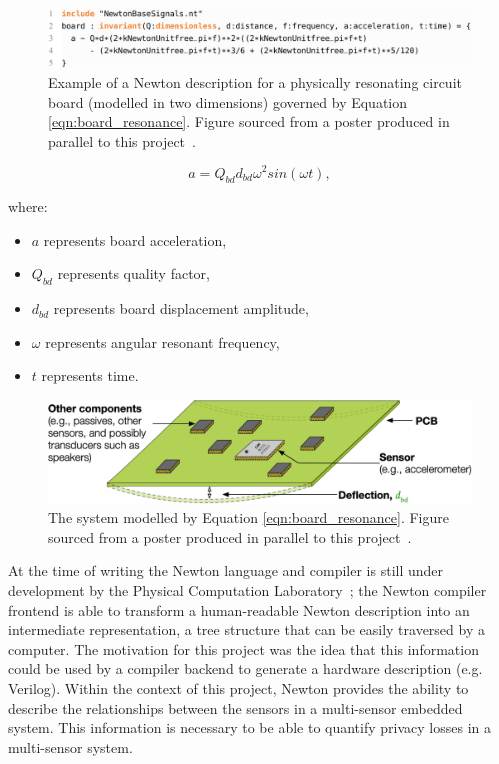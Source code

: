\documentclass[12pt]{article}
\begin{document}
    \begin{figure}[H]
      \centering
      \includegraphics[width=\textwidth]{fig/newton_description.png}
      \caption{Example of a Newton description for a physically resonating circuit board (modelled in two dimensions) governed by Equation \ref{eqn:board_resonance}. Figure sourced from a poster produced in parallel to this project~\cite{eurosys_poster}.}
      \label{fig:newton_description}
    \end{figure}

    \begin{equation}
      a = Q_{bd} d_{bd} \omega^2sin(\omega t),
      \label{eqn:board_resonance}
    \end{equation}

    where:
    \begin{itemize}
      \item $a$ represents board acceleration,
      \item $Q_{bd}$ represents quality factor,
      \item $d_{bd}$ represents board displacement amplitude,
      \item $\omega$ represents angular resonant frequency,
      \item $t$ represents time.
    \end{itemize}

    \begin{figure}[H]
      \centering
      \includegraphics[width=\textwidth]{fig/resonating_board.png}
      \caption{The system modelled by Equation \ref{eqn:board_resonance}. Figure sourced from a poster produced in parallel to this project~\cite{eurosys_poster}.}
      \label{fig:resonating_board}
    \end{figure}

    At the time of writing the Newton language and compiler is still under development by the Physical Computation Laboratory~\cite{physcomp}; the Newton compiler frontend is able to transform a human-readable Newton description into an intermediate representation, a tree structure that can be easily traversed by a computer. The motivation for this project was the idea that this information could be used by a compiler backend to generate a hardware description (e.g. Verilog). Within the context of this project, Newton provides the ability to describe the relationships between the sensors in a multi-sensor embedded system. This information is necessary to be able to quantify privacy losses in a multi-sensor system.
\end{document}
